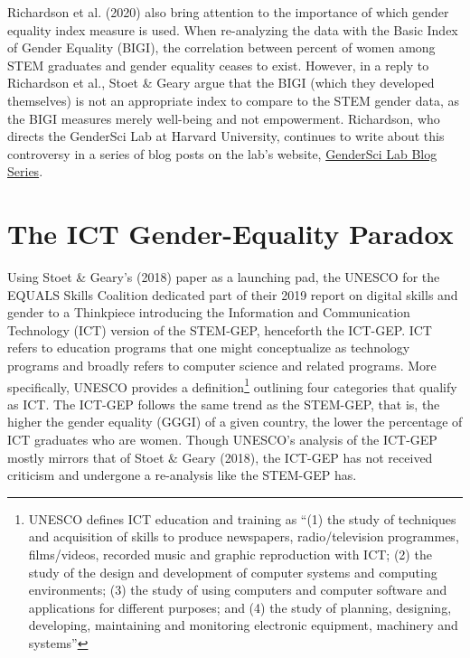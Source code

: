 \documentclass[]{book}
\begin{document}
Richardson et al. (2020) also bring attention to the importance of which
gender equality index measure is used. When re-analyzing the data with
the Basic Index of Gender Equality (BIGI), the correlation between
percent of women among STEM graduates and gender equality ceases to
exist. However, in a reply to Richardson et al., Stoet \& Geary
\citeyearpar{stoetGenderEqualityParadoxPart2020a} argue that the BIGI
(which they developed themselves) is not an appropriate index to compare
to the STEM gender data, as the BIGI measures merely well-being and not
empowerment. Richardson, who directs the GenderSci Lab at Harvard
University, continues to write about this controversy in a series of
blog posts on the lab's website,
\href{https://www.genderscilab.org/blog/the-gendersci-lab-takes-on-the-gender-equality-paradox-hypothesis-introduction-and-primer}{GenderSci
Lab Blog Series}.

\section{The ICT Gender-Equality
Paradox}\label{the-ict-gender-equality-paradox}

Using Stoet \& Geary's (2018) paper as a launching pad, the UNESCO for
the EQUALS Skills Coalition dedicated part of their 2019 report on
digital skills and gender \citep{westBlushIfCould2019a} to a Thinkpiece
introducing the Information and Communication Technology (ICT) version
of the STEM-GEP, henceforth the ICT-GEP. ICT refers to education
programs that one might conceptualize as technology programs and broadly
refers to computer science and related programs. More specifically,
UNESCO provides a definition\footnote{UNESCO defines ICT education and
  training as ``(1) the study of techniques and acquisition of skills to
  produce newspapers, radio/television programmes, films/videos,
  recorded music and graphic reproduction with ICT; (2) the study of the
  design and development of computer systems and computing environments;
  (3) the study of using computers and computer software and
  applications for different purposes; and (4) the study of planning,
  designing, developing, maintaining and monitoring electronic
  equipment, machinery and systems''} outlining four categories that
qualify as ICT. The ICT-GEP follows the same trend as the STEM-GEP, that
is, the higher the gender equality (GGGI) of a given country, the lower
the percentage of ICT graduates who are women. Though UNESCO's analysis
of the ICT-GEP mostly mirrors that of Stoet \& Geary (2018), the ICT-GEP
has not received criticism and undergone a re-analysis like the STEM-GEP
has.
\end{document}
